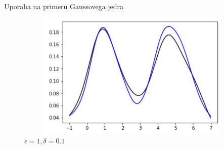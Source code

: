 \documentclass{beamer}
\begin{document}
\begin{frame}{Uporaba na primeru Gaussovega jedra}

\begin{figure}
\centering
\includegraphics[width = 12cm, height = 6cm]{druga}
\caption{$\epsilon = 1, \delta = 0.1$}
\end{figure}
\end{frame}





















%
%    
%    
%
%    
%
\end{document}
